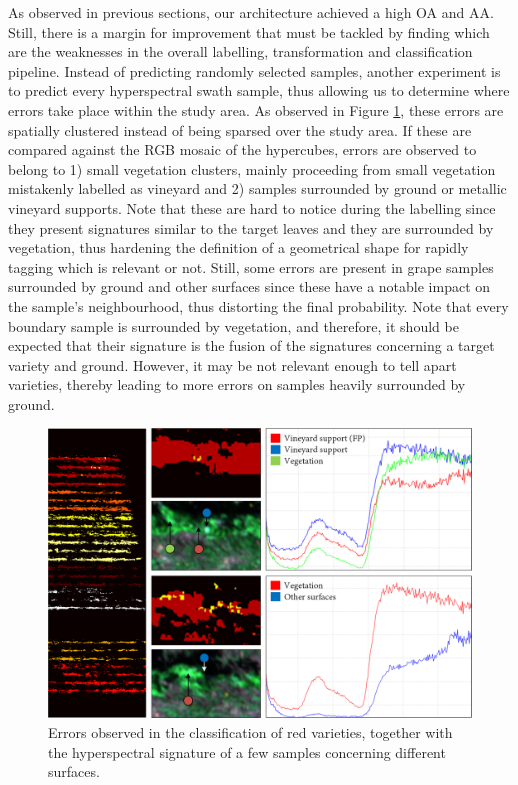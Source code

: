 As observed in previous sections, our architecture achieved a high OA and AA. Still, there is a margin for improvement that must be tackled by finding which are the weaknesses in the overall labelling, transformation and classification pipeline. Instead of predicting randomly selected samples, another experiment is to predict every hyperspectral swath sample, thus allowing us to determine where errors take place within the study area. As observed in Figure \ref{fig:spatial_labelling_errors}, these errors are spatially clustered instead of being sparsed over the study area. If these are compared against the RGB mosaic of the hypercubes, errors are observed to belong to 1) small vegetation clusters, mainly proceeding from small vegetation mistakenly labelled as vineyard and 2) samples surrounded by ground or metallic vineyard supports. Note that these are hard to notice during the labelling since they present signatures similar to the target leaves and they are surrounded by vegetation, thus hardening the definition of a geometrical shape for rapidly tagging which is relevant or not. Still, some errors are present in grape samples surrounded by ground and other surfaces since these have a notable impact on the sample's neighbourhood, thus distorting the final probability. Note that every boundary sample is surrounded by vegetation, and therefore, it should be expected that their signature is the fusion of the signatures concerning a target variety and ground. However, it may be not relevant enough to tell apart varieties, thereby leading to more errors on samples heavily surrounded by ground.

\begin{figure}[ht]
    \centering
    \includegraphics[width=\linewidth]{figs/vineyard_classification/spatial_labelling.png}
	\caption{Errors observed in the classification of red varieties, together with the hyperspectral signature of a few samples concerning different surfaces.  }
	\label{fig:spatial_labelling_errors}
\end{figure}

